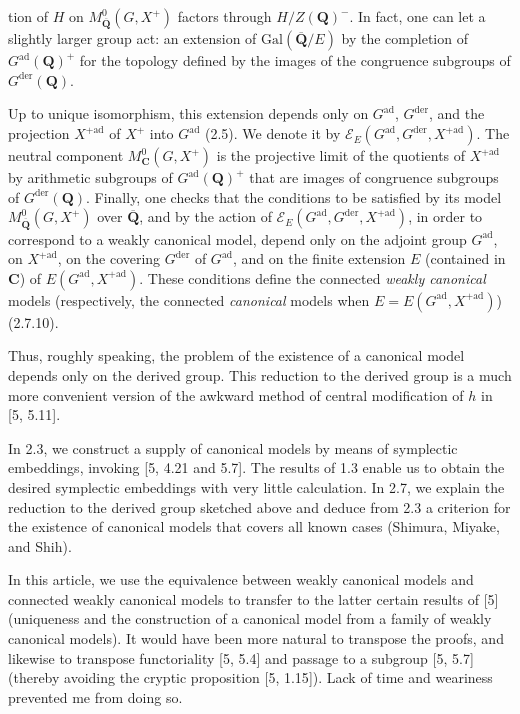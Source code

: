 \documentclass[10pt,a4paper]{article}
\newcommand{\SourcePage}[2]{\clearpage\setcounter{page}{#2}\typeout{D031_SOURCE_PAGE physical=#1 printed=#2}}
\begin{document}
\SourcePage{4}{250}
tion of \(H\) on \(M^0_{\overline{\mathbf Q}}(G,X^+)\) factors through \(H/Z(\mathbf Q)^-\). In fact, one can let a slightly larger group act: an extension of \(\mathrm{Gal}(\overline{\mathbf Q}/E)\) by the completion of \(G^{\mathrm{ad}}(\mathbf Q)^+\) for the topology defined by the images of the congruence subgroups of \(G^{\mathrm{der}}(\mathbf Q)\).

Up to unique isomorphism, this extension depends only on \(G^{\mathrm{ad}}\), \(G^{\mathrm{der}}\), and the projection \(X^{+\mathrm{ad}}\) of \(X^+\) into \(G^{\mathrm{ad}}\) (2.5). We denote it by \(\mathscr E_E(G^{\mathrm{ad}},G^{\mathrm{der}},X^{+\mathrm{ad}})\). The neutral component \(M^0_{\mathbf C}(G,X^+)\) is the projective limit of the quotients of \(X^{+\mathrm{ad}}\) by arithmetic subgroups of \(G^{\mathrm{ad}}(\mathbf Q)^+\) that are images of congruence subgroups of \(G^{\mathrm{der}}(\mathbf Q)\). Finally, one checks that the conditions to be satisfied by its model \(M^0_{\overline{\mathbf Q}}(G,X^+)\) over \(\overline{\mathbf Q}\), and by the action of \(\mathscr E_E(G^{\mathrm{ad}},G^{\mathrm{der}},X^{+\mathrm{ad}})\), in order to correspond to a weakly canonical model, depend only on the adjoint group \(G^{\mathrm{ad}}\), on \(X^{+\mathrm{ad}}\), on the covering \(G^{\mathrm{der}}\) of \(G^{\mathrm{ad}}\), and on the finite extension \(E\) (contained in \(\mathbf C\)) of \(E(G^{\mathrm{ad}},X^{+\mathrm{ad}})\). These conditions define the connected \emph{weakly canonical} models (respectively, the connected \emph{canonical} models when \(E=E(G^{\mathrm{ad}},X^{+\mathrm{ad}})\)) (2.7.10).

Thus, roughly speaking, the problem of the existence of a canonical model depends only on the derived group. This reduction to the derived group is a much more convenient version of the awkward method of central modification of \(h\) in {[}5, 5.11{]}.

In 2.3, we construct a supply of canonical models by means of symplectic embeddings, invoking {[}5, 4.21 and 5.7{]}. The results of 1.3 enable us to obtain the desired symplectic embeddings with very little calculation. In 2.7, we explain the reduction to the derived group sketched above and deduce from 2.3 a criterion for the existence of canonical models that covers all known cases (Shimura, Miyake, and Shih).

In this article, we use the equivalence between weakly canonical models and connected weakly canonical models to transfer to the latter certain results of {[}5{]} (uniqueness and the construction of a canonical model from a family of weakly canonical models). It would have been more natural to transpose the proofs, and likewise to transpose functoriality {[}5, 5.4{]} and passage to a subgroup {[}5, 5.7{]} (thereby avoiding the cryptic proposition {[}5, 1.15{]}). Lack of time and weariness prevented me from doing so.
\end{document}
